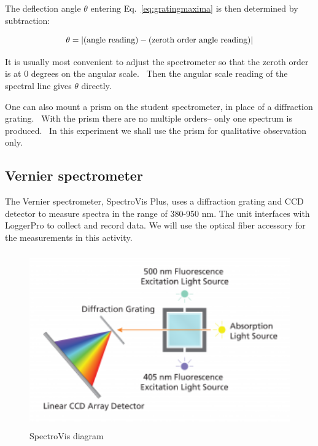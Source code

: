 \documentclass{article}
\begin{document}
The deflection angle ${\theta}$ entering Eq.~\ref{eq:gratingmaxima} is then determined by
subtraction: 

\begin{equation}
\theta = \left| {\rm(angle\ reading)} - {\rm (zeroth\ order\ angle\ reading)} \right|
\label{eq:calib}
\end{equation}

It is usually most convenient to adjust the spectrometer so that the
zeroth order is at 0 degrees on the angular scale. \ Then the angular
scale reading of the spectral line gives ${\theta}$ directly.

One can also mount a prism on the student spectrometer, in place of a
diffraction grating. \ With the prism there are no multiple orders--
only one spectrum is produced. \ In this experiment we shall use the
prism for qualitative observation only. 

\subsection{Vernier spectrometer}

The Vernier spectrometer, SpectroVis Plus, uses a diffraction grating and CCD detector to measure spectra in the range of 380-950 nm.   The unit interfaces with LoggerPro to collect and record data. We will use the optical fiber accessory for the measurements in this activity.

\begin{figure}
\begin{centering}
\includegraphics[width=4.4862in,height=2.972in]{images/SpectroVisDiagram.png} 
\caption{SpectroVis diagram}
\label{fig:spectrovisdiagram}
\end{centering}
\end{figure}
\end{document}
